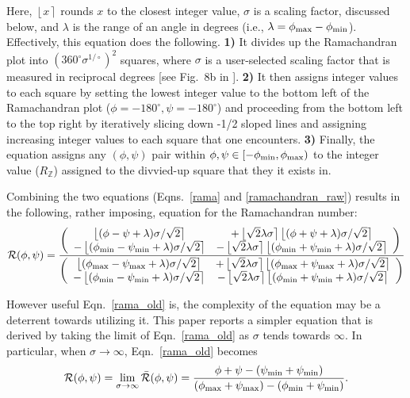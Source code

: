 \documentclass[fleqn,10pt,lineno]{wlpeerj} %
\newcommand{\round}[1]{\left \lfloor #1 \right \rceil }
\newcommand{\Eqn}[1]{Eqn.~\ref{#1}}
\newcommand{\Eqns}[1]{Eqns.~\ref{#1}}
\begin{document}
Here, $\round{x}$ rounds $x$ to the closest integer value, $\sigma$ is a scaling factor, discussed below, and $\lambda$ is the range of an angle in degrees (i.e., $\lambda=\phi_{\rm max}-\phi_{\rm min}$). Effectively, this equation does the following. \textbf{1)} It divides up the Ramachandran plot into $(360^\circ \sigma^{1/\circ})^2$  squares, where $\sigma$ is a user-selected scaling factor that is measured in reciprocal degrees [see Fig.~8b in \cite{Mannige2016}]. \textbf{2)} It then assigns integer values to each square by setting the lowest integer value to the bottom left of the Ramachandran plot ($\phi=-180^\circ,\psi=-180^\circ$) and proceeding from the bottom left to the top right by iteratively slicing down -1/2 sloped lines and assigning increasing integer values to each square that one encounters. \textbf{3)} Finally, the equation assigns any $(\phi,\psi)$ pair within $\phi,\psi \in [-\phi_{\rm min},\phi_{\rm max})$ to the integer value ($R_\mathbb{Z}$) assigned to the divvied-up square that they it exists in.

Combining the two equations (\Eqns{rama} and \ref{ramachandran_raw}) results in the following, rather imposing, equation for the Ramachandran number:
\begin{equation}
{\mathcal{R}}(\phi,\psi) = 
\frac{
    \left(
	\begin{array}{c c}
	\round{(\phi - \psi + \lambda)\sigma/\sqrt{2}}  
	&    + \round{\sqrt{2} \lambda\sigma} \round{(\phi+\psi + \lambda)\sigma/\sqrt{2}} \\
		 - \round{(\phi_{\rm{min}} - \psi_{\rm{min}} + \lambda)\sigma/\sqrt{2}}  
	&    - \round{\sqrt{2} \lambda\sigma} \round{(\phi_{\rm{min}}+\psi_{\rm{min}} + \lambda)\sigma/\sqrt{2}}
	\end{array}
	\right)\\
 }{
    \left(
	\begin{array}{c c}
	\round{(\phi_{\rm{max}} - \psi_{\rm{max}} + \lambda)\sigma/\sqrt{2}}  
	& + \round{\sqrt{2} \lambda\sigma} \round{(\phi_{\rm{max}}+\psi_{\rm{max}} + \lambda)\sigma/\sqrt{2}}\\
	- \round{(\phi_{\rm{min}} - \psi_{\rm{min}} + \lambda)\sigma/\sqrt{2}}  
	& - \round{\sqrt{2} \lambda\sigma} \round{(\phi_{\rm{min}}+\psi_{\rm{min}} + \lambda)\sigma/\sqrt{2}}
	\end{array}
	\right)
} \label{rama_old}
\end{equation}

However useful \Eqn{rama_old} is, the complexity of the equation may be a deterrent towards utilizing it. This paper reports a simpler equation that is derived by taking the limit of \Eqn{rama_old} as $\sigma$ tends towards $\infty$. In particular, when $\sigma\to\infty$, \Eqn{rama_old} becomes
\begin{equation}
{\mathcal{R}}(\phi,\psi) = \lim_{\sigma\to\infty}{\bar{\mathcal{R}}}(\phi,\psi) = \frac{\phi+\psi-(\psi_{\rm min}+\psi_{\rm min})}{(\phi_{\rm max}+\psi_{\rm max})-(\phi_{\rm min}+\psi_{\rm min})}.
\label{ramaGeneral}
\end{equation}
\end{document}
